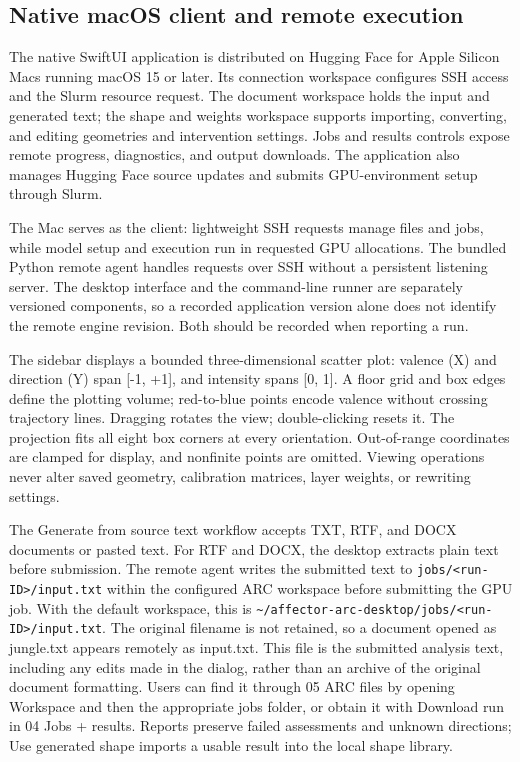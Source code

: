 \documentclass[manuscript,screen,nonacm]{acmart}
\begin{document}
\subsection{Native macOS client and remote execution}

The native SwiftUI application is distributed on Hugging Face for Apple Silicon Macs running macOS 15 or later. Its connection workspace configures SSH access and the Slurm resource request. The document workspace holds the input and generated text; the shape and weights workspace supports importing, converting, and editing geometries and intervention settings. Jobs and results controls expose remote progress, diagnostics, and output downloads. The application also manages Hugging Face source updates and submits GPU-environment setup through Slurm.

The Mac serves as the client: lightweight SSH requests manage files and jobs, while model setup and execution run in requested GPU allocations. The bundled Python remote agent handles requests over SSH without a persistent listening server. The desktop interface and the command-line runner are separately versioned components, so a recorded application version alone does not identify the remote engine revision. Both should be recorded when reporting a run.

The sidebar displays a bounded three-dimensional scatter plot: valence (X) and direction (Y) span [-1, +1], and intensity spans [0, 1]. A floor grid and box edges define the plotting volume; red-to-blue points encode valence without crossing trajectory lines. Dragging rotates the view; double-clicking resets it. The projection fits all eight box corners at every orientation. Out-of-range coordinates are clamped for display, and nonfinite points are omitted. Viewing operations never alter saved geometry, calibration matrices, layer weights, or rewriting settings.

The Generate from source text workflow accepts TXT, RTF, and DOCX documents or pasted text. For RTF and DOCX, the desktop extracts plain text before submission. The remote agent writes the submitted text to \nolinkurl{jobs/<run-ID>/input.txt} within the configured ARC workspace before submitting the GPU job. With the default workspace, this is \nolinkurl{~/affector-arc-desktop/jobs/<run-ID>/input.txt}. The original filename is not retained, so a document opened as jungle.txt appears remotely as input.txt. This file is the submitted analysis text, including any edits made in the dialog, rather than an archive of the original document formatting. Users can find it through 05 ARC files by opening Workspace and then the appropriate jobs folder, or obtain it with Download run in 04 Jobs + results. Reports preserve failed assessments and unknown directions; Use generated shape imports a usable result into the local shape library.
\end{document}
